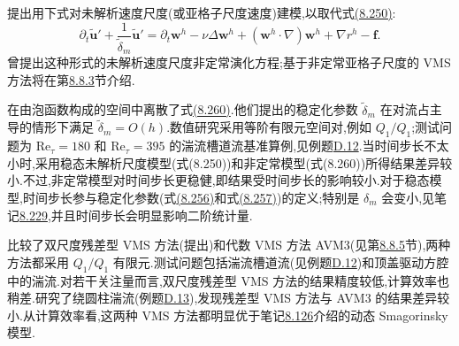 \begin{note}[未解析速度尺度的非定常模型]
\label{note:vms-time-dependent-unresolved-velocity-model}
\textcite{GamnitzerGravemeierWall2010}提出用下式对未解析速度尺度(或亚格子尺度速度)建模,以取代式\hyperref[eq:vms-algebraic-unresolved-model]{(8.250)}:
\begin{equation}\label{eq:vms-time-dependent-unresolved-scale-model}
 \partial_t\widetilde{\bm{u}}'
 +\frac1{\widetilde\delta_m}\widetilde{\bm{u}}'
 =\partial_t\bm{w}^h-\nu\Delta\bm{w}^h
 +(\bm{w}^h\cdot\nabla)\bm{w}^h+\nabla r^h-\bm f.
\end{equation}
\textcite{Codina2002,CodinaPrincipeGuaschBadia2007}曾提出这种形式的未解析速度尺度非定常演化方程;基于非定常亚格子尺度的 VMS 方法将在第\hyperref[subsec:vms-time-dependent-method]{8.8.3}节介绍.

\textcite{GamnitzerGravemeierWall2010}在由泡函数构成的空间中离散了式\hyperref[eq:vms-time-dependent-unresolved-scale-model]{(8.260)}.他们提出的稳定化参数 $\widetilde\delta_m$ 在对流占主导的情形下满足 $\widetilde\delta_m=O(h)$.数值研究采用等阶有限元空间对,例如 $Q_1/Q_1$;测试问题为 $\mathrm{Re}_\tau=180$ 和 $\mathrm{Re}_\tau=395$ 的湍流槽道流基准算例,见例题\hyperref[ex:appendix-d-12]{D.12}.当时间步长不太小时,采用稳态未解析尺度模型(式(8.250))和非定常模型(式(8.260))所得结果差异较小.不过,非定常模型对时间步长更稳健,即结果受时间步长的影响较小.对于稳态模型,时间步长参与稳定化参数(式\hyperref[eq:vms-momentum-stabilization-parameter]{(8.256)}和式\hyperref[eq:vms-grad-div-stabilization-parameter]{(8.257)})的定义;特别是 $\delta_m$ 会变小,见笔记\hyperref[note:vms-stabilization-parameter-comments]{8.229},并且时间步长会明显影响二阶统计量.
\end{note}

\begin{note}[数值计算经验]
\label{note:vms-residual-based-numerical-experience}
\textcite{GravemeierGeeKronbichlerWall2010}比较了双尺度残差型 VMS 方法(\textcite{Bazilevs2007}提出)和代数 VMS 方法 AVM3(见第\hyperref[subsec:vms-orthogonal-subscales]{8.8.5}节),两种方法都采用 $Q_1/Q_1$ 有限元.测试问题包括湍流槽道流(见例题\hyperref[ex:appendix-d-12]{D.12})和顶盖驱动方腔中的湍流.对若干关注量而言,双尺度残差型 VMS 方法的结果精度较低,计算效率也稍差.\textcite{GravemeierKronbichlerGeeWall2011}研究了绕圆柱湍流(例题\hyperref[ex:appendix-d-13]{D.13}),发现残差型 VMS 方法与 AVM3 的结果差异较小.从计算效率看,这两种 VMS 方法都明显优于笔记\hyperref[note:dynamic-smagorinsky-model]{8.126}介绍的动态 Smagorinsky 模型.
\end{note}

